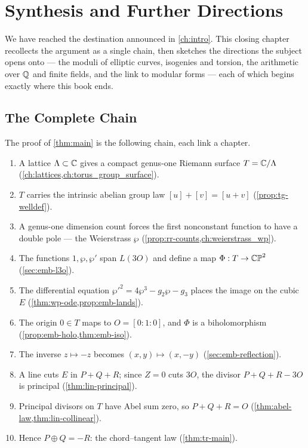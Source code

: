 \chapter{Synthesis and Further Directions}
\label{ch:synthesis}

We have reached the destination announced in \cref{ch:intro}. This closing
chapter recollects the argument as a single chain, then sketches the directions
the subject opens onto --- the moduli of elliptic curves, isogenies and torsion,
the arithmetic over \(\mathbb{Q}\) and finite fields, and the link to modular forms ---
each of which begins exactly where this book ends.

\section{The Complete Chain}
\label{sec:syn-chain}

The proof of \cref{thm:main} is the following chain, each link a chapter.

\begin{enumerate}
\item A lattice \(\Lambda \subset \mathbb{C}\) gives a compact genus-one Riemann surface
\(T = \mathbb{C}/\Lambda\) (\cref{ch:lattices,ch:torus_group_surface}).
\item \(T\) carries the intrinsic abelian group law \([u]+[v]=[u+v]\)
(\cref{prop:tg-welldef}).
\item A genus-one dimension count forces the first nonconstant function to have a
double pole --- the Weierstrass \(\wp\)
(\cref{prop:rr-counts,ch:weierstrass_wp}).
\item The functions \(1, \wp, \wp'\) span \(L(3O)\) and define a map
\(\Phi : T \to \mathbb{CP}^2\) (\cref{sec:emb-l3o}).
\item The differential equation \(\wp'^2 = 4\wp^3 - g_2\wp - g_3\) places the image
on the cubic \(E\) (\cref{thm:wp-ode,prop:emb-lands}).
\item The origin \(0 \in T\) maps to \(O = [0:1:0]\), and \(\Phi\) is a
biholomorphism (\cref{prop:emb-holo,thm:emb-iso}).
\item The inverse \(z \mapsto -z\) becomes \((x,y) \mapsto (x,-y)\)
(\cref{sec:emb-reflection}).
\item A line cuts \(E\) in \(P+Q+R\); since \(Z = 0\) cuts \(3O\), the divisor
\(P+Q+R-3O\) is principal (\cref{thm:lin-principal}).
\item Principal divisors on \(T\) have Abel sum zero, so \(P+Q+R = O\)
(\cref{thm:abel-law,thm:lin-collinear}).
\item Hence \(P \oplus Q = -R\): the chord--tangent law (\cref{thm:tr-main}).
\end{enumerate}

